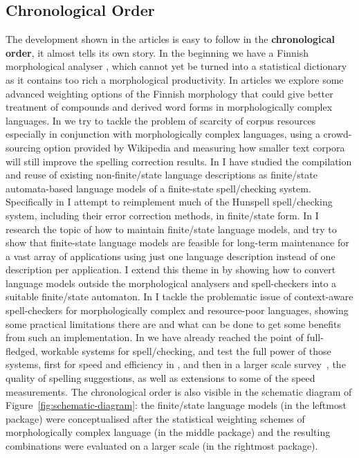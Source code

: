 \documentclass[officiallayout,final]{unihelcompling}
\begin{document}
\subsection{Chronological Order}
\label{subsec:chronological}

The development shown in the articles is easy to follow in the
\textbf{chronological order}, it almost tells its own story. In the beginning
we have a Finnish morphological analyser \citep{pirinen2008suomen}, which
cannot yet be turned into a statistical dictionary as it contains too rich a
morphological productivity. In articles
 we explore some advanced
weighting options of the Finnish morphology that could give better treatment of
compounds and derived word forms in morphologically complex languages. In
 we try to tackle the problem of scarcity of
corpus resources especially in conjunction with morphologically complex
languages, using a crowd-sourcing option provided by Wikipedia and measuring
how smaller text corpora will still improve the spelling correction results. In
 I have studied the
compilation and reuse of existing non-finite\-/state language descriptions as
finite\-/state automata-based language models of a finite-state
spell\-/checking system.  Specifically in  I
attempt to reimplement much of the Hunspell spell\-/checking system, including
their error correction methods, in finite\-/state form. In
 I research the topic of how to maintain
finite\-/state \glspl{language model}, and try to show that finite-state
language models are feasible for long-term maintenance for a vast array of
applications using just one language description instead of one description per
application.  I extend this theme in  by
showing how to convert language models outside the morphological analysers and
spell-checkers into a suitable finite\-/state automaton. In
 I tackle the problematic issue of
context-aware spell-checkers for morphologically complex and resource-poor
languages, showing some practical limitations there are and what can be done to
get some benefits from such an implementation. In
 we have already reached the
point of full-fledged, workable systems for spell\-/checking, and test the full
power of those systems, first for speed and efficiency in
, and then in a larger scale
survey~, the quality of spelling suggestions, as
well as extensions to some of the speed measurements.  The chronological order
is also visible in the schematic diagram of Figure~\ref{fig:schematic-diagram}:
the finite\-/state language models (in the leftmost package) were
conceptualised after the statistical weighting schemes of morphologically
complex language (in the middle package) and the resulting combinations were
evaluated on a larger scale (in the rightmost package).
\end{document}
